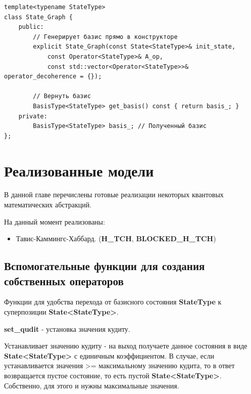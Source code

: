 \documentclass[12pt,fleqn]{article}
\begin{document}
\begin{mdframed}[linecolor=black, topline=true, bottomline=true,
leftline=false, rightline=false]
\begin{verbatim}
template<typename StateType>
class State_Graph {
    public:
        // Генерирует базис прямо в конструкторе
        explicit State_Graph(const State<StateType>& init_state,
            const Operator<StateType>& A_op,
            const std::vector<Operator<StateType>>& operator_decoherence = {});

        // Вернуть базис
        BasisType<StateType> get_basis() const { return basis_; }
    private:
        BasisType<StateType> basis_; // Полученный базис
};
\end{verbatim}
\end{mdframed}

        \section{Реализованные модели}
        В данной главе перечислены готовые реализации некоторых квантовых математических абстракций.

        На данный момент реализованы:
        \begin{itemize}
            \item{Тавис-Каммингс-Хаббард. (\textbf{H\_TCH}, \textbf{BLOCKED\_H\_TCH})}
        \end{itemize}

        \subsection{Вспомогательные функции для создания собственных операторов}
        Функции для удобства перехода от базисного состояния \textbf{StateType} к суперпозиции \newline \textbf{State<StateType>}.

        \begin{center}
            \textbf{set\_qudit} - установка значения кудиту.
        \end{center}

        Устанавливает значению кудиту - на выход получаете данное состояния в виде \newline \textbf{State<StateType>} с единичным коэффициентом.
         В случае, если устанавливается значения >= максимальному значению кудита, то в ответ возвращается пустое состояние, то есть пустой \textbf{State<StateType>}.
        Собственно, для этого и нужны максимальные значения.
\end{document}
